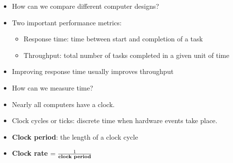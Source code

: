 
\begin{frame}[fragile]


\begin{itemize}
\item How can we compare different computer designs?

\item Two important performance metrics:
    \begin{itemize}
    	\item Response time: time between start and completion of a
    	task
    	\item Throughput: total number of tasks completed in a given unit of time
    \end{itemize}
    
\item Improving response time usually improves throughput
\item How can we measure time?

\item Nearly all computers have a clock.
    \item Clock cycles or ticks: discrete time when hardware events take place.
\item \textbf{Clock period}: the length of a clock cycle
\item \textbf{Clock rate} $=\frac{1}{\text{\bf clock period}}$





\end{itemize}
\end{frame}
